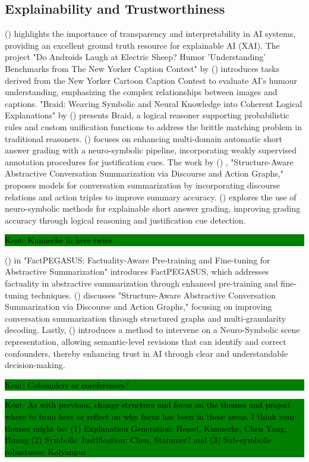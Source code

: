 \documentclass[hf]{ceurart}
\newcommand{\citeauthornum}[1]{\citeauthor{#1} (\citeyear{#1}) \cite{#1}}
\newcommand{\pinaforecomment}[4]{\colorbox{#1}{\textcolor{#4}{\parbox{.8\linewidth}{#2: #3}}}}
\newcommand{\osullikomment}[1]{\pinaforecomment{green}{Kent}{#1}{black}}
\begin{document}
\subsection{Explainability and Trustworthiness}\label{subsec:disc_xai}
\citeauthornum{IHMC_Explainable_AI} highlights the importance of transparency and interpretability in AI systems, providing an excellent ground truth resource for explainable AI (XAI). The project "Do Androids Laugh at Electric Sheep? Humor 'Understanding' Benchmarks from The New Yorker Caption Contest" by \citeauthornum{Hessel2022} introduces tasks derived from the New Yorker Cartoon Caption Contest to evaluate AI's humour understanding, emphasizing the complex relationships between images and captions. "Braid: Weaving Symbolic and Neural Knowledge into Coherent Logical Explanations" by \citeauthornum{Kalyanpur2020} presents Braid, a logical reasoner supporting probabilistic rules and custom unification functions to address the brittle matching problem in traditional reasoners. \citeauthornum{Kuennecke2024} focuses on enhancing multi-domain automatic short answer grading with a neuro-symbolic pipeline, incorporating weakly supervised annotation procedures for justification cues. The work by \citeauthornum{Chen2021}, "Structure-Aware Abstractive Conversation Summarization via Discourse and Action Graphs," proposes models for conversation summarization by incorporating discourse relations and action triples to improve summary accuracy. \citeauthornum{Kuennecke2024} explores the use of neuro-symbolic methods for explainable short answer grading, improving grading accuracy through logical reasoning and justification cue detection. 
%
\osullikomment{Kunnecke in here twice}
%
\citeauthornum{Huang2023} in "FactPEGASUS: Factuality-Aware Pre-training and Fine-tuning for Abstractive Summarization" introduces FactPEGASUS, which addresses factuality in abstractive summarization through enhanced pre-training and fine-tuning techniques. \citeauthornum{Chen2021} discusses "Structure-Aware Abstractive Conversation Summarization via Discourse and Action Graphs," focusing on improving conversation summarization through structured graphs and multi-granularity decoding. Lastly, \citeauthornum{Stammer2021} introduces a method to intervene on a Neuro-Symbolic scene representation, allowing semantic-level revisions that can identify and correct confounders, thereby enhancing trust in AI through clear and understandable decision-making.
\osullikomment{Cofounders or coreferences?}

\osullikomment{As with previous, change structure and focus on the themes and project where to from here or reflect on why focus has been in these areas. I think your themes might be: (1) Explanation Generation: Hessel, Kunnecke, Chen Yang, Huang (2) Symbolic Justification: Chen, Stammer? and (3) Sub-symbolic robustness: Kalyanpur}
\end{document}
